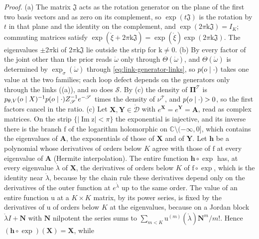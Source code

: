 \noindent\emph{Proof.}
(a) The matrix $\mathfrak J$ acts as the rotation generator on the plane of the first two basis vectors and
as zero on its complement, so $\exp(t\mathfrak J)$ is the rotation by $t$ in that plane and the identity on
the complement, and $\exp(2\pi\mathrm k\mathfrak J)=I_K$; commuting matrices satisfy
$\exp(\mathring\xi+2\pi\mathrm k\mathfrak J)=\exp(\mathring\xi)\exp(2\pi\mathrm k\mathfrak J)$. The eigenvalues
$\pm2\pi\mathrm k\mathrm i$ of $2\pi\mathrm k\mathfrak J$ lie outside the strip for $\mathrm k\neq0$. (b) By
 every factor of the joint other than the prior reads $\mathring\omega$ only
through $\Theta(\mathring\omega)$, and $\Theta(\mathring\omega)$ is determined by $\exp_\sigma(\mathring\omega)$
through \eqref{eq:link-generator-links}, so $p(o\mid\cdot)$ takes one value at the two families; each
loop defect depends on the generators only through the links ((a)), and so
does $\mathscr S$. By (c) the density of $\boldsymbol\Pi^{\mathscr T}$ is
$p_{\theta,V}(o\mid X)^{-1}p(o\mid\cdot)Z_{\mathscr S}^{-1}e^{-\mathscr S}$ times the density of
$\nu^{\mathscr T}$, and $p(o\mid\cdot)>0$, so the first factors cancel in the ratio.
(c) Let $\mathbf X,\mathbf Y\in\mathring{\mathcal D}$ with $e^{\mathbf X}=e^{\mathbf Y}=\mathbf A$, read as complex
matrices. On the strip $\{\lvert\operatorname{Im}\mathrm z\rvert<\pi\}$ the exponential is injective, and its
inverse there is the branch $\mathrm f$ of the logarithm holomorphic on $\mathbb C\setminus(-\infty,0]$,
which contains the eigenvalues of $\mathbf A$, the exponentials of those of $\mathbf X$ and of $\mathbf Y$.
Let $\mathbf h$ be a polynomial whose derivatives of orders below $K$ agree with those of $\mathrm f$ at every
eigenvalue of $\mathbf A$ (Hermite interpolation). The entire function $\mathbf h\circ\exp$ has, at every
eigenvalue $\mathring\lambda$ of $\mathbf X$, the derivatives of orders below $K$ of
$\mathrm f\circ\exp$, which is the identity near $\mathring\lambda$, because by the chain rule these
derivatives depend only on the derivatives of the outer function at $e^{\mathring\lambda}$ up to the same
order. The value of an entire function $\mathrm u$ at a $K\times K$ matrix, by its power series, is fixed
by the derivatives of $\mathrm u$ of orders below $K$ at the eigenvalues, because on a Jordan block
$\mathring\lambda I+\mathbf N$ with $\mathbf N$ nilpotent the series sums to
$\sum_{m<K}\mathrm u^{(m)}(\mathring\lambda)\mathbf N^m/m!$. Hence $(\mathbf h\circ\exp)(\mathbf X)=\mathbf X$, while
